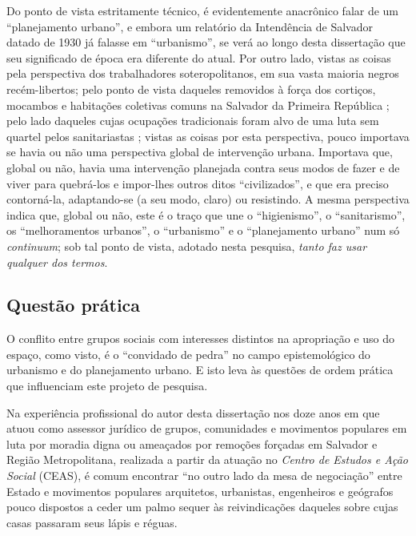 Do ponto de vista estritamente técnico, é evidentemente anacrônico falar de um ``planejamento urbano'', e embora um relatório da Intendência de Salvador datado de 1930 já falasse em ``urbanismo'', se verá ao longo desta dissertação que seu significado de época era diferente do atual. Por outro lado, vistas as coisas pela perspectiva dos trabalhadores soteropolitanos, em sua vasta maioria negros recém-libertos; pelo ponto de vista daqueles removidos à força dos cortiços, mocambos e habitações coletivas comuns na Salvador da Primeira República \cite{cardoso1990proleta}; pelo lado daqueles cujas ocupações tradicionais foram alvo de uma luta sem quartel pelos sanitariastas \cite{barbosa2009}; vistas as coisas por esta perspectiva, pouco importava se havia ou não uma perspectiva global de intervenção urbana. Importava que, global ou não, havia uma intervenção planejada contra seus modos de fazer e de viver para quebrá-los e impor-lhes outros ditos ``civilizados'', e que era preciso contorná-la, adaptando-se (a seu modo, claro) ou resistindo. A mesma perspectiva indica que, global ou não, este é o traço que une o ``higienismo'', o ``sanitarismo'', os ``melhoramentos urbanos'', o ``urbanismo'' e o ``planejamento urbano'' num só \textit{continuum}; sob tal ponto de vista, adotado nesta pesquisa, \textit{tanto faz usar qualquer dos termos}. 

\subsection[Questão prática]{Questão prática}
\label{subsec:questprat}

O conflito entre grupos sociais com interesses distintos na apropriação e uso do espaço, como visto, é o ``convidado de pedra'' no campo epistemológico do urbanismo e do planejamento urbano. E isto leva às questões de ordem prática que influenciam este projeto de pesquisa.

Na experiência profissional do autor desta dissertação nos doze anos em que atuou como assessor jurídico de grupos, comunidades e movimentos populares em luta por moradia digna ou ameaçados por remoções forçadas em Salvador e Região Metropolitana, realizada a partir da atuação no \textit{Centro de Estudos e Ação Social} (CEAS), é comum encontrar ``no outro lado da mesa de negociação'' entre Estado e movimentos populares arquitetos, urbanistas, engenheiros e geógrafos pouco dispostos a ceder um palmo sequer às reivindicações daqueles sobre cujas casas passaram seus lápis e réguas.


